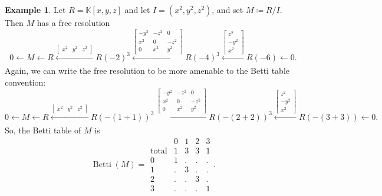 \documentclass[12pt,a4paper]{article}
\newcommand{\KK}{\mathbb{K}}
\DeclareMathOperator{\Betti}{Betti}
\theoremstyle{definition}
\newtheorem{example}[theorem]{Example}
\numberwithin{equation}{section}
\begin{document}
\begin{example}
    Let $R = \KK[x,y,z]$ and let $I = (x^2, y^2, z^2)$, and set $M \coloneqq R/I$.
    Then $M$ has a free resolution
    \begin{equation*}
        0 \leftarrow M 
        \leftarrow R 
        \xleftarrow[]{\begin{bmatrix}
                x^2 & y^2 & z^2
            \end{bmatrix}} R(-2)^3 
        \xleftarrow[]{\begin{bmatrix}
                -y^2 & -z^2 & 0 \\
                x^2 & 0 & -z^2 \\
                0 & x^2 & y^2
            \end{bmatrix}} R(-4)^3 
        \xleftarrow[]{\begin{bmatrix}
                z^2 \\ -y^2 \\ x^2
            \end{bmatrix}} R(-6) 
        \leftarrow 0.
    \end{equation*}
    Again, we can write the free resolution to be more amenable to the Betti table convention:
        \begin{equation*}
        0 \leftarrow M 
        \leftarrow R 
        \xleftarrow[]{\begin{bmatrix}
                x^2 & y^2 & z^2
            \end{bmatrix}} R(-(1+1))^3 
        \xleftarrow[]{\begin{bmatrix}
                -y^2 & -z^2 & 0 \\
                x^2 & 0 & -z^2 \\
                0 & x^2 & y^2
            \end{bmatrix}} R(-(2+2))^3 
        \xleftarrow[]{\begin{bmatrix}
                z^2 \\ -y^2 \\ x^2
            \end{bmatrix}} R(-(3+3)) 
        \leftarrow 0.
    \end{equation*}
    So, the Betti table of $M$ is
    \begin{equation*}
        \Betti(M) =
        \begin{array}{r|cccc}
          & 0 & 1 & 2 & 3 \\
        \hline
        \text{total} & 1 & 3 & 3 & 1 \\
        \hline
         0 & 1 & . & . & . \\
         1 & . & 3 & . & . \\
         2 & . & . & 3 & . \\
         3 & . & . & . & 1
    \end{array}.
    \end{equation*}
\end{example}
\end{document}

